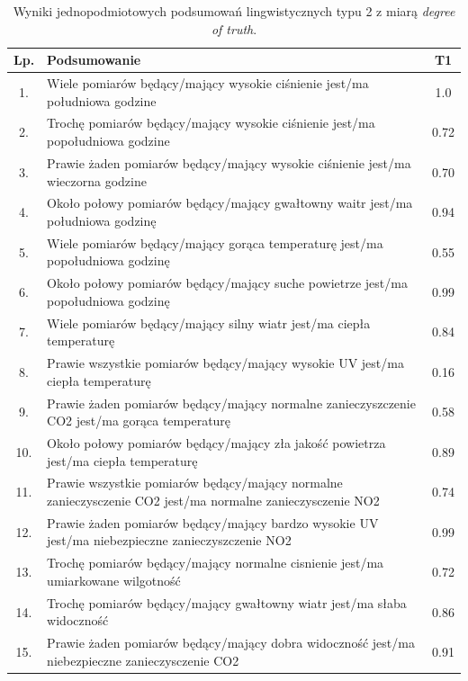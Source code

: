 \documentclass{article}
\begin{document}
\begin{table}[H]
\begin{center}
\normalsize %
\begin{tabular}{|c|p{10cm}|c|} %
\hline
\textbf{Lp.} & \textbf{Podsumowanie} & \textbf{T1} \\ \hline
1. & Wiele pomiarów będący/mający wysokie ciśnienie jest/ma południowa godzine & 1.0 \\\hline
2. & Trochę pomiarów będący/mający wysokie ciśnienie jest/ma popołudniowa godzine & 0.72 \\ \hline
3. & Prawie żaden pomiarów będący/mający wysokie ciśnienie jest/ma wieczorna godzine & 0.70 \\ \hline
4. & Około połowy pomiarów będący/mający gwałtowny waitr jest/ma południowa godzinę & 0.94 \\ \hline
5. & Wiele pomiarów będący/mający gorąca temperaturę jest/ma popołudniowa godzinę & 0.55 \\ \hline
6. & Około połowy pomiarów będący/mający suche powietrze jest/ma popołudniowa godzinę & 0.99 \\\hline
7. & Wiele pomiarów będący/mający silny wiatr jest/ma ciepła temperaturę & 0.84 \\ \hline
8. & Prawie wszystkie pomiarów będący/mający wysokie UV jest/ma ciepła temperaturę & 0.16 \\ \hline
9. & Prawie żaden pomiarów będący/mający normalne zanieczyszczenie CO2 jest/ma gorąca temperaturę & 0.58 \\ \hline
10. & Około połowy pomiarów będący/mający zła jakość powietrza jest/ma ciepła temperaturę & 0.89 \\ \hline
11. & Prawie wszystkie pomiarów będący/mający normalne zanieczysczenie CO2 jest/ma normalne zanieczysczenie NO2 & 0.74 \\ \hline
12. & Prawie żaden pomiarów będący/mający bardzo wysokie UV jest/ma niebezpieczne zanieczyszczenie NO2 & 0.99 \\ \hline
13. & Trochę pomiarów będący/mający normalne cisnienie jest/ma umiarkowane wilgotność & 0.72 \\ \hline
14. & Trochę pomiarów będący/mający gwałtowny wiatr jest/ma słaba widoczność & 0.86 \\ \hline
15. & Prawie żaden pomiarów będący/mający dobra widoczność jest/ma niebezpieczne zanieczysczenie CO2 & 0.91 \\ \hline

\end{tabular}
\caption{Wyniki jednopodmiotowych podsumowań lingwistycznych typu 2 z miarą \textit{degree of truth}.}
\end{center}
\end{table}
\end{document}
